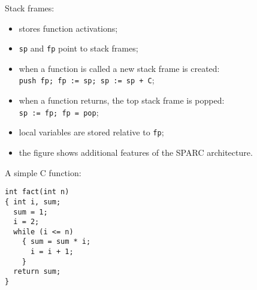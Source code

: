\begin{slide*}
\begin{center}
\end{center}
\vfil
\end{slide*}

\begin{slide*}
Stack frames:
\begin{itemize}
\item stores function activations;
\item {\tt sp} and {\tt fp} point to stack frames;
\item when a function is called a new stack frame is created:\\
      {\tt push fp; fp := sp; sp := sp + C};
\item when a function returns, the top stack frame is popped:\\
      {\tt sp := fp;  fp = pop};
\item local variables are stored relative to {\tt fp};
\item the figure shows additional features of the SPARC architecture.
\end{itemize}
\vfil
\end{slide*}

\begin{slide*}
A simple C function:\\

\begin{tt}
\begin{verbatim}
int fact(int n)
{ int i, sum;
  sum = 1;
  i = 2;
  while (i <= n)
    { sum = sum * i;
      i = i + 1;
    }
  return sum;
}
\end{verbatim}
\end{tt}
\vfil
\end{slide*}

